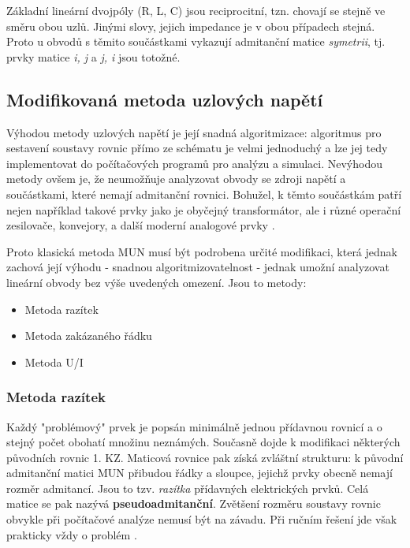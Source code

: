         Základní lineární dvojpóly (R, L, C) jsou reciprocitní, tzn. chovají se stejně ve směru 
        obou uzlů. Jinými slovy, jejich impedance je v obou případech stejná. Proto u obvodů s 
        těmito součástkami vykazují admitanční matice \emph{symetrii}, tj. prvky matice \emph{i, j} 
        a \emph{j, i} jsou totožné.

        
    \subsection{Modifikovaná metoda uzlových napětí}\label{TEO:chap_MMUN}
      Výhodou metody uzlových napětí je její snadná algoritmizace: algoritmus pro sestavení 
      soustavy rovnic přímo ze schématu je velmi jednoduchý a lze jej tedy implementovat do 
      počítačových programů pro analýzu a simulaci. Nevýhodou metody ovšem je, že neumožňuje 
      analyzovat obvody se zdroji napětí a součástkami, které nemají admitanční rovnici. Bohužel, k 
      těmto součástkám patří nejen například takové prvky jako je obyčejný transformátor, ale i 
      různé operační zesilovače, konvejory, a další moderní analogové prvky \cite[s.~77]{Biolek2004}.
      
      Proto klasická metoda MUN musí být podrobena určité modifikaci, která jednak zachová její 
      výhodu - snadnou algoritmizovatelnost - jednak umožní analyzovat lineární obvody bez výše 
      uvedených omezení. Jsou to metody:
      \begin{itemize}\itemsep0em
        \item Metoda razítek
        \item Metoda zakázaného řádku
        \item Metoda U/I
      \end{itemize}

      \subsubsection{Metoda razítek}
        Každý "problémový" prvek je popsán minimálně jednou přídavnou rovnicí a o stejný počet 
        obohatí množinu neznámých. Současně dojde k modifikaci některých původních rovnic 1. KZ. 
        Maticová rovnice pak získá zvláštní strukturu: k původní admitanční matici MUN přibudou 
        řádky a sloupce, jejichž prvky obecně nemají rozměr admitancí. Jsou to tzv. \emph{razítka} 
        přídavných elektrických prvků. Celá matice se pak nazývá \textbf{pseudoadmitanční}. 
        Zvětšení rozměru soustavy rovnic obvykle při počítačové analýze nemusí být na závadu. Při 
        ručním řešení jde však prakticky vždy o problém \cite[s.~78]{Biolek2004}.
        
